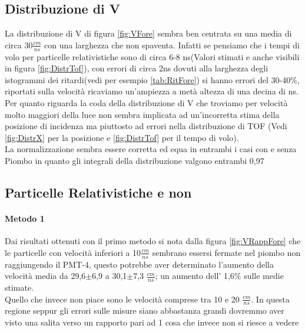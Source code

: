 \documentclass[a4paper]{article}
\begin{document}
\subsection{Distribuzione di V}
La distribuzione di V di figura \ref{fig:VFore} sembra ben centrata su una media di circa 30$\frac{cm}{ns}$ con una larghezza che non spaventa. Infatti se pensiamo che i tempi di volo per particelle relativistiche sono di circa 6-8 ns(Valori stimati e anche visibili in figura \ref{fig:DistrTof}), con errori di circa 2ns dovuti alla larghezza degli istogrammi dei ritardi(vedi per esempio \ref{tab:RitFore}) si hanno errori del 30-40$\%$, riportati sulla velocità ricaviamo un'ampiezza a metà altezza di una decina di ns. Per quanto riguarda la coda della distribuzione di V che troviamo per velocità molto maggiori della luce non sembra implicata ad un'incorretta stima della posizione di incidenza ma piuttosto ad errori nella distribuzione di TOF (Vedi \ref{fig:DistrX} per la posizione e \ref{fig:DistrTof} per il tempo di volo).\\
La normalizzazione sembra essere corretta ed equa in entrambi i casi con e senza Piombo in quanto gli integrali della distribuzione valgono entrambi 0,97
\subsection{Particelle Relativistiche e non}
\paragraph{Metodo 1}
Dai risultati ottenuti con il primo metodo si nota dalla figura \ref{fig:VRappFore} che le particelle con velocità inferiori a 10$\frac{cm}{ns}$ sembrano essersi fermate nel piombo non raggiungendo il PMT-4, questo potrebbe aver determinato l'aumento della velocità media da 29,6$\pm$6,9 a 30,1$\pm$7,3 $\frac{cm}{ns}$; un aumento dell' 1,6$\%$ sulle medie stimate.\\
Quello che invece non piace sono le velocità comprese tra 10 e 20 $\frac{cm}{ns}$. In questa regione seppur gli errori sulle misure siano abbastanza grandi dovremmo aver visto una salita verso un rapporto pari ad 1 cosa che invece non si riesce a vedere
\end{document}
